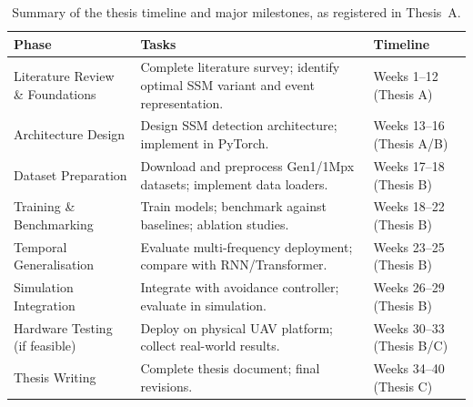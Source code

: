 \documentclass[11pt, a4paper]{report}
\begin{document}
\begin{table}[htbp]
    \centering
    \caption{Summary of the thesis timeline and major milestones, as registered in Thesis~A.}
    \label{tab:timeline}
    \renewcommand{\arraystretch}{1.4}
    \begin{tabularx}{\textwidth}{|l|X|l|}
        \hline
        \rowcolor[gray]{0.9} \textbf{Phase} & \textbf{Tasks} & \textbf{Timeline} \\ \hline
        Literature Review \& Foundations & Complete literature survey; identify optimal SSM variant and event representation. & Weeks 1--12 (Thesis A)  \\ \hline
        Architecture Design & Design SSM detection architecture; implement in PyTorch. & Weeks 13--16 (Thesis A/B)  \\ \hline
        Dataset Preparation & Download and preprocess Gen1/1Mpx datasets; implement data loaders. & Weeks 17--18 (Thesis B) \\ \hline
        Training \& Benchmarking & Train models; benchmark against baselines; ablation studies. & Weeks 18--22 (Thesis B)  \\ \hline
        Temporal Generalisation & Evaluate multi-frequency deployment; compare with RNN/Transformer. & Weeks 23--25 (Thesis B)\\ \hline
        Simulation Integration & Integrate with avoidance controller; evaluate in simulation. & Weeks 26--29 (Thesis B)\\ \hline
        Hardware Testing (if feasible) & Deploy on physical UAV platform; collect real-world results. & Weeks 30--33 (Thesis B/C)\\ \hline
        Thesis Writing & Complete thesis document; final revisions. & Weeks 34--40 (Thesis C)  \\ \hline
    \end{tabularx}
\end{table}
\end{document}
